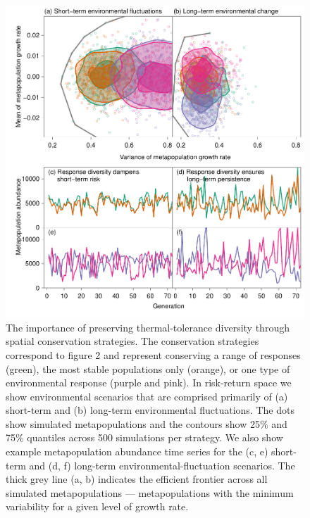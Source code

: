 \begin{figure}[htbp]
\centering
\includegraphics[width=4.5in]{metafolio/Fig4}
\caption{The importance of preserving thermal-tolerance diversity through spatial conservation strategies. The conservation strategies correspond to figure 2 and represent conserving a range of responses (green), the most stable populations only (orange), or one type of environmental response (purple and pink). In risk-return space we show environmental scenarios that are comprised primarily of (a) short-term and (b) long-term environmental fluctuations. The dots show simulated metapopulations and the contours show 25\% and 75\% quantiles across 500 simulations per strategy. We also show example metapopulation abundance time series for the (c, e) short-term and (d, f) long-term environmental-fluctuation scenarios. The thick grey line (a, b) indicates the efficient frontier across all simulated metapopulations --- metapopulations with the minimum variability for a given level of growth rate.} \label{f:sp}
\end{figure}

\clearpage

